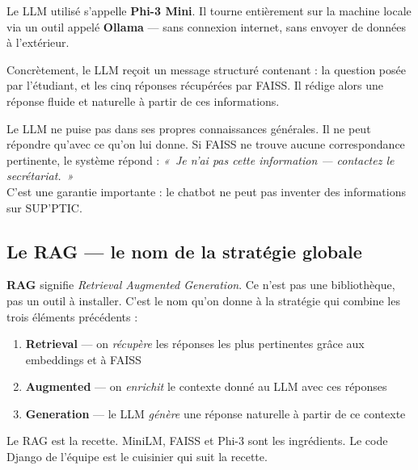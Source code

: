 \documentclass[11pt,a4paper]{article}
\begin{document}
Le LLM utilisé s'appelle \textbf{Phi-3 Mini}. Il tourne
entièrement sur la machine locale via un outil appelé
\textbf{Ollama} --- sans connexion internet, sans envoyer
de données à l'extérieur.

Concrètement, le LLM reçoit un message structuré contenant :
la question posée par l'étudiant, et les cinq réponses
récupérées par FAISS. Il rédige alors une réponse fluide
et naturelle à partir de ces informations.

\begin{important}
Le LLM ne puise pas dans ses propres connaissances générales.
Il ne peut répondre qu'avec ce qu'on lui donne. Si FAISS
ne trouve aucune correspondance pertinente, le système
répond : \textit{«~Je n'ai pas cette information ---
contactez le secrétariat.~»} \\
\vspace{0.2cm}
C'est une garantie importante : le chatbot ne peut pas
inventer des informations sur SUP'PTIC.
\end{important}

\subsection{Le RAG --- le nom de la stratégie globale}

\textbf{RAG} signifie \textit{Retrieval Augmented Generation}.
Ce n'est pas une bibliothèque, pas un outil à installer.
C'est le nom qu'on donne à la stratégie qui combine les trois
éléments précédents :

\begin{enumerate}
    \item \textbf{Retrieval} --- on \textit{récupère} les réponses
    les plus pertinentes grâce aux embeddings et à FAISS
    \item \textbf{Augmented} --- on \textit{enrichit} le contexte
    donné au LLM avec ces réponses
    \item \textbf{Generation} --- le LLM \textit{génère} une réponse
    naturelle à partir de ce contexte
\end{enumerate}

Le RAG est la recette. MiniLM, FAISS et Phi-3 sont les ingrédients.
Le code Django de l'équipe est le cuisinier qui suit la recette.

\clearpage
\end{document}
